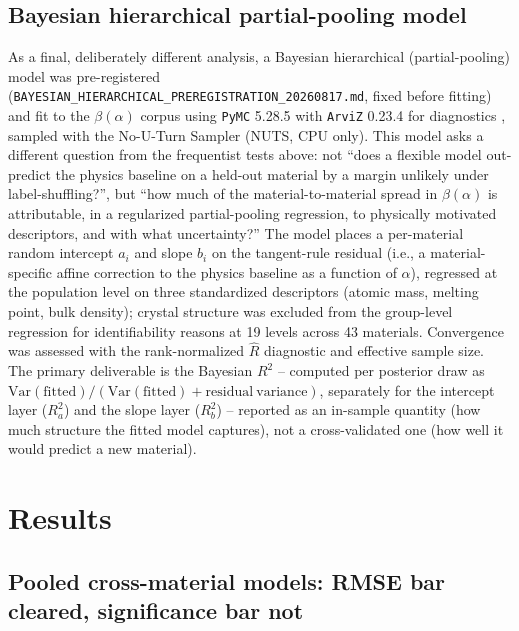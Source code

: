 \documentclass[aip,amsmath,amssymb,reprint]{revtex4-1}
\begin{document}
\subsection{Bayesian hierarchical partial-pooling model}
\label{ssec:bayes_method}

As a final, deliberately different analysis, a Bayesian hierarchical
(partial-pooling) model was pre-registered
(\texttt{BAYESIAN\_HIERARCHICAL\_PREREGISTRATION\_20260817.md}, fixed
before fitting) and fit to the $\beta(\alpha)$ corpus using
\texttt{PyMC} 5.28.5 with \texttt{ArviZ} 0.23.4 for diagnostics
\citep{salvatier2016pymc3}, sampled with the No-U-Turn Sampler (NUTS,
CPU only). This model asks a different question from the frequentist
tests above: not ``does a flexible model out-predict the physics
baseline on a held-out material by a margin unlikely under
label-shuffling?'', but ``how much of the material-to-material spread
in $\beta(\alpha)$ is attributable, in a regularized partial-pooling
regression, to physically motivated descriptors, and with what
uncertainty?'' The model places a per-material random intercept
$a_i$ and slope $b_i$ on the tangent-rule residual (i.e., a
material-specific affine correction to the physics baseline as a
function of $\alpha$), regressed at the population level on three
standardized descriptors (atomic mass, melting point, bulk density);
crystal structure was excluded from the group-level regression for
identifiability reasons at 19 levels across 43 materials. Convergence
was assessed with the rank-normalized $\hat{R}$ diagnostic
\citep{vehtari2021rhat} and effective sample size. The primary
deliverable is the Bayesian $R^2$
\citep{gelman2019r2} -- computed per posterior draw as
$\mathrm{Var}(\mathrm{fitted})/(\mathrm{Var}(\mathrm{fitted}) +
\mathrm{residual\ variance})$, separately for the intercept layer
($R^2_a$) and the slope layer ($R^2_b$) -- reported as an in-sample
quantity (how much structure the fitted model captures), not a
cross-validated one (how well it would predict a new material).

\section{Results}
\label{sec:results}

\subsection{Pooled cross-material models: RMSE bar cleared, significance bar not}
\label{ssec:pooled}
\end{document}
